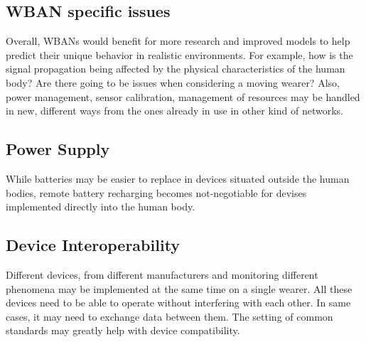 \documentclass[conference]{IEEEtran}
\begin{document}
\subsection {WBAN specific issues}
Overall, WBANs would benefit for more research and improved models to help predict their unique behavior in realistic environments. For example, how is the signal propagation being affected by the physical characteristics of the human body? Are there going to be issues when considering a moving wearer? Also, power management, sensor calibration, management of resources may be handled in new, different ways from the ones already in use in other kind of networks.

\subsection {Power Supply}
While batteries may be easier to replace in devices situated outside the human bodies, remote battery recharging becomes not-negotiable for devises implemented directly into the human body.

\subsection {Device Interoperability}
Different devices, from different manufacturers and monitoring different phenomena may be implemented at the same time on a single wearer. All these devices need to be able to operate without interfering with each other. In same cases, it may need to exchange data between them. The setting of common standards may greatly help with device compatibility. 
\end{document}
